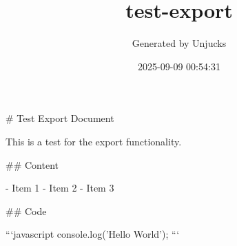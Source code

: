 \documentclass{article}
\title{test-export}
\author{Generated by Unjucks}
\date{2025-09-09 00:54:31}
\begin{document}
\maketitle

\tableofcontents
\newpage


\# Test Export Document

This is a test for the export functionality.

\#\# Content

- Item 1
- Item 2
- Item 3

\#\# Code

```javascript
console.log('Hello World');
```
\end{document}

